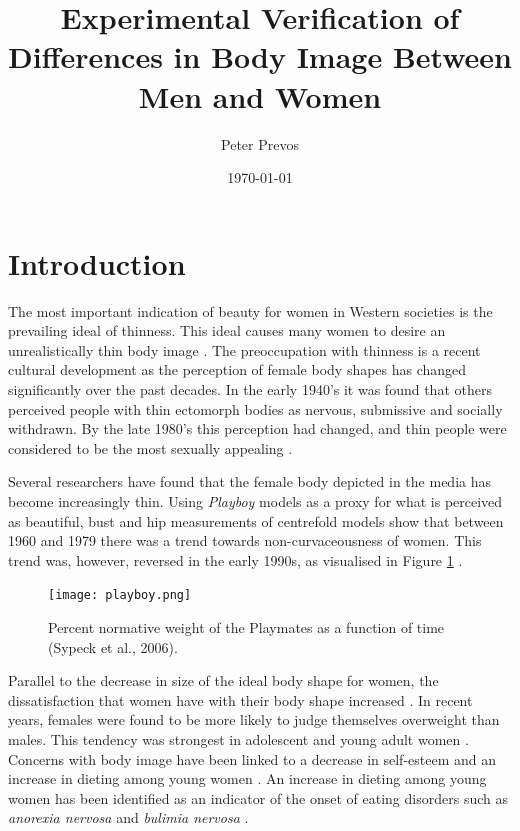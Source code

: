 \documentclass[a4paper, jou]{apa6}
\affiliation{Monash University}
\author{Peter Prevos}
\date{\today}
\title{Experimental Verification of Differences in Body Image Between Men and Women}
\begin{document}
\maketitle

\section{Introduction}
\label{sec:org690ba08}
The most important indication of beauty for women in Western societies is the prevailing ideal of thinness. This ideal causes many women to desire an unrealistically thin body image \cite{lamb_body_1993}. The preoccupation with thinness is a recent cultural development as the perception of female body shapes has changed significantly over the past decades. In the early 1940's it was found that others perceived people with thin ectomorph bodies as nervous, submissive and socially withdrawn. By the late 1980's this perception had changed, and thin people were considered to be the most sexually appealing \cite{turner_influence_1997}.

Several researchers have found that the female body depicted in the media has become increasingly thin. Using \emph{Playboy} models as a proxy for what is perceived as beautiful, bust and hip measurements of centrefold models show that between 1960 and 1979 there was a trend towards non-curvaceousness of women. This trend was, however, reversed in the early 1990s, as visualised in Figure \ref{playboy} \cite{garner_cultural_1980,turner_influence_1997,sypeck_cultural_2006,wiseman_cultural_1992}.

\begin{figure}[htbp]
\centering
\texttt{[image: playboy.png]}
\caption{Percent normative weight of the Playmates as a function of time (Sypeck et al., 2006). \label{playboy}}
\end{figure}

Parallel to the decrease in size of the ideal body shape for women, the dissatisfaction that women have with their body shape increased \cite{cash_how_2004}. In recent years, females were found to be more likely to judge themselves overweight than males. This tendency was strongest in adolescent and young adult women \cite{fallon_sex_1985,tiggeman_development_1990,tiggeman_body-size_1992}. Concerns with body image have been linked to a decrease in self-esteem and an increase in dieting among young women \cite{hill_eating_1992}. An increase in dieting among young women has been identified as an indicator of the onset of eating disorders such as \emph{anorexia nervosa} and \emph{bulimia nervosa} \cite{barker_body_2003,fear_prevalence_1996,lamb_body_1993}.
\end{document}
